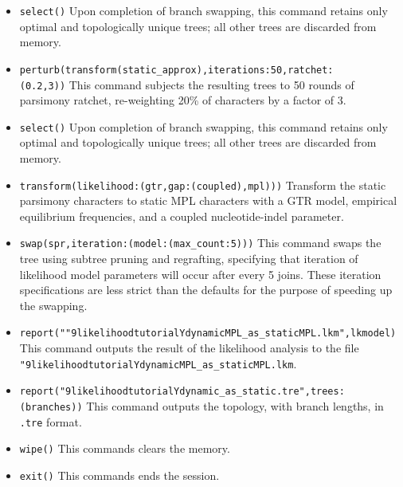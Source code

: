\begin{itemize}
\item \texttt{select()} Upon completion of branch swapping, this command retains only optimal and topologically unique trees; all other trees are discarded from memory. 
\item \texttt{perturb(transform(static\_approx),iterations:50,ratchet:\\(0.2,3))} This command subjects the resulting trees to 50 rounds of parsimony ratchet, re-weighting 20\% of characters by a factor of 3.
\item \texttt{select()} Upon completion of branch swapping, this command retains only optimal and topologically unique trees; all other trees are discarded from memory. 
\item \texttt{transform(likelihood:(gtr,gap:(coupled),mpl)))} Transform the static parsimony characters to static MPL characters with a GTR model, empirical equilibrium frequencies, and a coupled nucleotide-indel parameter.
\item \texttt{swap(spr,iteration:(model:(max\_count:5)))} This command swaps the tree using subtree pruning and regrafting, specifying that iteration of likelihood model parameters will occur after every 5 joins. These iteration specifications are less strict than the defaults for the purpose of speeding up the swapping.
\item \texttt{report(""9likelihoodtutorialYdynamicMPL\_as\_staticMPL.lkm",lkmodel)} This command outputs the result of the likelihood analysis to the file \texttt{"9likelihoodtutorialYdynamicMPL\_as\_staticMPL.lkm}.
\item \texttt{report("9likelihoodtutorialYdynamic\_as\_static.tre",trees:(branches))} This command outputs the topology, with branch lengths, in \texttt{.tre} format.
\item \texttt{wipe()} This commands clears the memory.
\item \texttt{exit()} This commands ends the \poy session.
\end{itemize}


